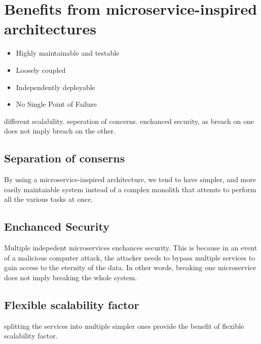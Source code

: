 	\section{Benefits from microservice-inspired architectures}
		\label{benefits-microservices}
		\begin{itemize}
			\item Highly maintainable and testable
			\item Loosely coupled
			\item Independently deployable
			\item No Single Point of Failure
		\end{itemize}
		different scalability.
		seperation of concerns.
		enchanced security, as breach on one does not imply breach on the other.
		\subsection{Separation of conserns}
		By using a microservice-inspired architecture, we tend to have simpler, and more easily maintaiable system instead of a 
		complex monolith that attemts to perform all the various tasks at once.
		\subsection{Enchanced Security}
		Multiple indepedent microservices enchances security. This is because in an event of a malicious computer attack, the attacker needs
		to bypass multiple services to gain access to the eternity of the data. In other words, breaking one microservice does not imply breaking
		the whole system.
		\subsection{Flexible scalability factor}
		splitting the services into multiple simpler ones provide the benefit of flexible scalability factor. 
		
				
					
			
		
	
